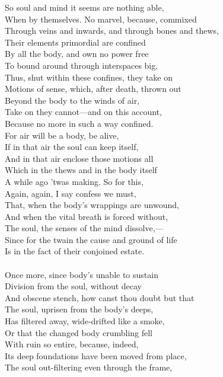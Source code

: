 So soul and mind it seems are nothing able,\\
When by themselves. No marvel, because, commixed\\
Through veins and inwards, and through bones and thews,\\
Their elements primordial are confined\\
By all the body, and own no power free\\
To bound around through interspaces big,\\
Thus, shut within these confines, they take on\\
Motions of sense, which, after death, thrown out\\
Beyond the body to the winds of air,\\
Take on they cannot—and on this account,\\
Because no more in such a way confined.\\
For air will be a body, be alive,\\
If in that air the soul can keep itself,\\
And in that air enclose those motions all\\
Which in the thews and in the body itself\\
A while ago 'twas making. So for this,\\
Again, again, I say confess we must,\\
That, when the body's wrappings are unwound,\\
And when the vital breath is forced without,\\
The soul, the senses of the mind dissolve,—\\
Since for the twain the cause and ground of life\\
Is in the fact of their conjoined estate.\\
\\
Once more, since body's unable to sustain\\
Division from the soul, without decay\\
And obscene stench, how canst thou doubt but that\\
The soul, uprisen from the body's deeps,\\
Has filtered away, wide-drifted like a smoke,\\
Or that the changed body crumbling fell\\
With ruin so entire, because, indeed,\\
Its deep foundations have been moved from place,\\
The soul out-filtering even through the frame,\\
